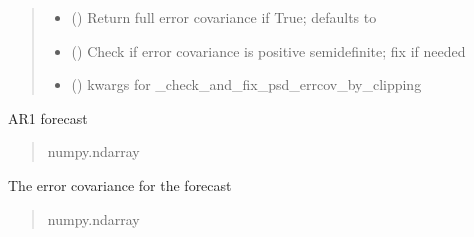 \documentclass[letterpaper,10pt,english]{sphinxmanual}
\begin{document}
\begin{fulllineitems}
\begin{fulllineitems}
\begin{quote}
\begin{description}
\begin{itemize}
\item {}
\sphinxAtStartPar
{} () \textendash{} Return full error covariance if True;
defaults to 

\item {}
\sphinxAtStartPar
{} () \textendash{} Check if error covariance is positive semi\sphinxhyphen{}definite; fix if needed

\item {}
\sphinxAtStartPar
{} (\sphinxstyleliteralemphasis{\sphinxupquote{ | }}) \textendash{} kwargs for \_check\_and\_fix\_psd\_errcov\_by\_clipping

\end{itemize}

\end{description}\end{quote}

\begin{fulllineitems}
\label{\detokenize{kalman:glomar_gridding.autoregressive_kalman.Autoregressive1ForecastVector.forecast}}
\pysigstartsignatures
\pysigline
{}
\pysigstopsignatures
\sphinxAtStartPar
AR1 forecast
\begin{quote}\begin{description}
\sphinxAtStartPar
numpy.ndarray

\end{description}\end{quote}

\end{fulllineitems}


\begin{fulllineitems}
\label{\detokenize{kalman:glomar_gridding.autoregressive_kalman.Autoregressive1ForecastVector.errcov}}
\pysigstartsignatures
\pysigline
{}
\pysigstopsignatures
\sphinxAtStartPar
The error covariance for the forecast
\begin{quote}\begin{description}
\sphinxAtStartPar
numpy.ndarray


\end{description}
\end{quote}
\end{fulllineitems}
\end{fulllineitems}
\end{fulllineitems}
\end{document}
